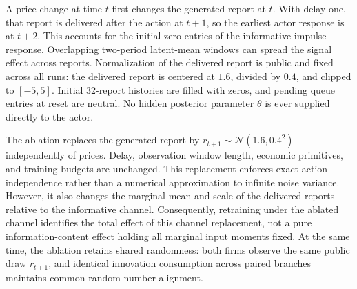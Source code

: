 A price change at time $t$ first changes the generated report at $t$. With delay one, that report is delivered after the action at $t+1$, so the earliest actor response is at $t+2$. This accounts for the initial zero entries of the informative impulse response. Overlapping two-period latent-mean windows can spread the signal effect across reports. Normalization of the delivered report is public and fixed across all runs: the delivered report is centered at $1.6$, divided by $0.4$, and clipped to $[-5,5]$. Initial 32-report histories are filled with zeros, and pending queue entries at reset are neutral. No hidden posterior parameter $\theta$ is ever supplied directly to the actor.

The ablation replaces the generated report by $r_{t+1} \sim \mathcal{N}(1.6, 0.4^2)$ independently of prices. Delay, observation window length, economic primitives, and training budgets are unchanged. This replacement enforces exact action independence rather than a numerical approximation to infinite noise variance. However, it also changes the marginal mean and scale of the delivered reports relative to the informative channel. Consequently, retraining under the ablated channel identifies the total effect of this channel replacement, not a pure information-content effect holding all marginal input moments fixed. At the same time, the ablation retains shared randomness: both firms observe the same public draw $r_{t+1}$, and identical innovation consumption across paired branches maintains common-random-number alignment.

